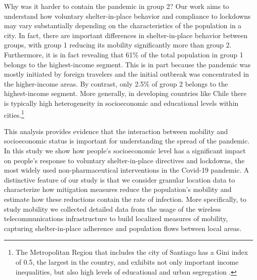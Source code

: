 Why was it harder to contain the pandemic in group 2? %
Our work aims to understand how voluntary shelter-in-place behavior and compliance to lockdowns may vary substantially depending on the characteristics of the population in a city. 
In fact, there are important differences in shelter-in-place behavior between groups, with group 1 reducing its mobility significantly more than group 2. 
Furthermore, it is in fact revealing that 61\% of the total population in group 1 belongs to the highest-income segment. This is in part because the pandemic was mostly initiated by foreign travelers and the initial outbreak was concentrated in the higher-income areas. By contrast, only 2.5\% of group 2 belongs to the  highest-income segment. More generally, in developing countries like Chile there is typically high heterogeneity in socioeconomic and educational levels within cities.\footnote{The Metropolitan Region that includes the city of Santiago has a Gini index of 0.5, the largest in the country, and exhibits not only important income inequalities, but also high levels of educational and urban segregation \citep{romero2012assessing, elacqua2012impact}.} 


This analysis provides evidence that the interaction between mobility and socioeconomic status is important for understanding the spread of the pandemic. In this study we show how people's socioeconomic level has a significant impact on people's response to voluntary shelter-in-place directives and lockdowns, the most widely used non-pharmaceutical interventions in the Covid-19 pandemic.
A distinctive feature of our study is that we consider granular location data to characterize how mitigation measures reduce the population's mobility and estimate how these reductions contain the rate of infection. More specifically, to study mobility we collected detailed data from the usage of the wireless telecommunications infrastructure to build localized measures of mobility, capturing shelter-in-place adherence and population flows between local areas. 

